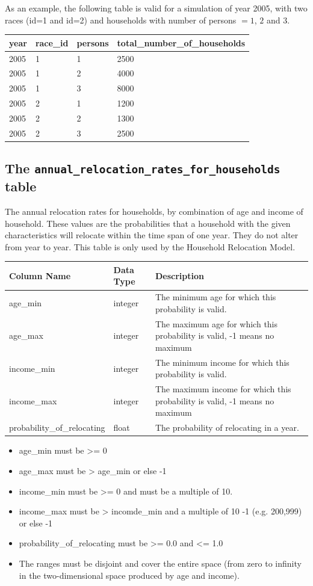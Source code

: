 As an example, the following table is valid for a simulation of year 2005, with two races (id=1 and id=2) and
households with number of persons $=1$, $2$ and $3$.

\begin{tabular}{llll}
year &race_id &persons &total_number_of_households \\
\hline
2005 &1 &1 &2500 \\
\hline
2005 &1 &2 &4000 \\
\hline
2005 &1 &3 &8000 \\
\hline
2005 &2 &1 &1200 \\
\hline
2005 &2 &2 &1300 \\
\hline
2005 &2 &3 &2500 \\
\hline
\end{tabular}

\subsection{The {\tt annual_relocation_rates_for_households} table}


The annual relocation rates for households, by combination of age and income of
household. These values are the probabilities that a household with the given
characteristics will relocate within the time span of one year. They do not
alter from year to year. This table is only used by the Household Relocation
Model. 


\begin{tabular}{llp{4in}}
\textbf{Column Name} & \textbf{Data Type} & \textbf{Description} \\
\hline
age_min & integer & The minimum age for which this probability is valid.  \\
\hline
age_max & integer & The maximum age for which this probability is valid, -1 means no maximum  \\
\hline
income_min & integer & The minimum income for which this probability is valid.  \\
\hline
income_max & integer & The maximum income for which this probability is valid, -1 means no maximum  \\
\hline
probability_of_relocating & float & The probability of relocating in a year.  \\
\hline

\end{tabular}

\begin{itemize} \tight
\item age_min must be \textgreater{}= 0
\item age_max must be \textgreater{} age_min or else -1
\item income_min must be \textgreater{}= 0 and must be a multiple of 10.
\item income_max must be \textgreater{} incomde_min and a multiple of 10 -1
(e.g. 200,999) or else -1
\item probability_of_relocating must be \textgreater{}= 0.0 and \textless{}= 1.0
\item The ranges must be disjoint and cover the entire space (from zero to
infinity in the two-dimensional space produced by age and income).
\end{itemize}

